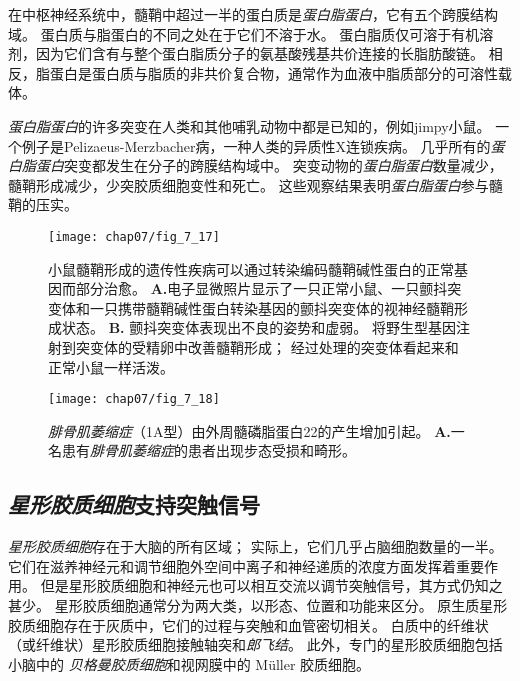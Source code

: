 \begin{proposition}[髓鞘蛋白缺陷破坏神经信号传导]
	\quad \quad 在中枢神经系统中，髓鞘中超过一半的蛋白质是\textit{蛋白脂蛋白}，它有五个跨膜结构域。
	蛋白质与脂蛋白的不同之处在于它们不溶于水。
	蛋白脂质仅可溶于有机溶剂，因为它们含有与整个蛋白脂质分子的氨基酸残基共价连接的长脂肪酸链。
	相反，脂蛋白是蛋白质与脂质的非共价复合物，通常作为血液中脂质部分的可溶性载体。
	
	\quad \quad \textit{蛋白脂蛋白}的许多突变在人类和其他哺乳动物中都是已知的，例如jimpy小鼠。
	一个例子是Pelizaeus-Merzbacher病，一种人类的异质性X连锁疾病。
	几乎所有的\textit{蛋白脂蛋白}突变都发生在分子的跨膜结构域中。
	突变动物的\textit{蛋白脂蛋白}数量减少，髓鞘形成减少，少突胶质细胞变性和死亡。
	这些观察结果表明\textit{蛋白脂蛋白}参与髓鞘的压实。
	
\end{proposition}


\begin{figure}[htbp]
	\centering
	\texttt{[image: chap07/fig\_7\_17]}
	\caption{小鼠髓鞘形成的遗传性疾病可以通过转染编码髓鞘碱性蛋白的正常基因而部分治愈。
	\textbf{A.}电子显微照片显示了一只正常小鼠、一只颤抖突变体和一只携带髓鞘碱性蛋白转染基因的颤抖突变体的视神经髓鞘形成状态。
	\textbf{B.} 颤抖突变体表现出不良的姿势和虚弱。
	将野生型基因注射到突变体的受精卵中改善髓鞘形成；
	经过处理的突变体看起来和正常小鼠一样活泼\cite{readhead1987expression}。}
	\label{fig:7_17}
\end{figure}


\begin{figure}[htbp]
	\centering
	\texttt{[image: chap07/fig\_7\_18]}
	\caption{\textit{腓骨肌萎缩症}（1A型）由外周髓磷脂蛋白22的产生增加引起。
	\textbf{A.}一名患有\textit{腓骨肌萎缩症}的患者出现步态受损和畸形。}
	\label{fig:7_18}
\end{figure}




\subsection{\textit{星形胶质细胞}支持突触信号}

\textit{星形胶质细胞}存在于大脑的所有区域；
实际上，它们几乎占脑细胞数量的一半。
它们在滋养神经元和调节细胞外空间中离子和神经递质的浓度方面发挥着重要作用。
但是星形胶质细胞和神经元也可以相互交流以调节突触信号，其方式仍知之甚少。
星形胶质细胞通常分为两大类，以形态、位置和功能来区分。
原生质星形胶质细胞存在于灰质中，它们的过程与突触和血管密切相关。
白质中的纤维状（或纤维状）星形胶质细胞接触轴突和\textit{郎飞结}。
此外，专门的星形胶质细胞包括小脑中的 \textit{贝格曼胶质细胞}和视网膜中的 Müller 胶质细胞。


